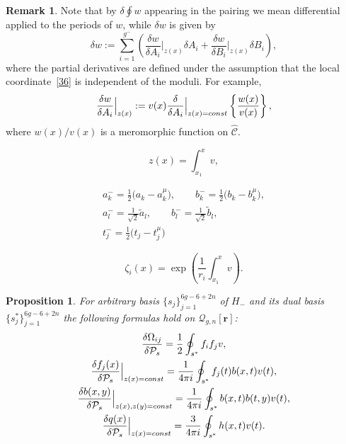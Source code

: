 \documentclass[10pt,a4paper]{article}
\numberwithin{equation}{section}
\newtheorem{Proposition}[Theorem]{Proposition}
\theoremstyle{definition}
\newtheorem{Remark}[Theorem]{Remark}
\begin{document}
\begin{Remark}
Note that by $\delta \oint w$ appearing in the pairing we mean differential applied to the periods of $w$, while $\delta w$ is given by
\begin{equation}\label{80}\delta w:=\sum^{g^-}_{i=1} \left(\frac{\delta w}{\delta A_i}\Big|_{z(x)} \delta A_i +\frac{\delta w}{\delta B_i}\Big|_{z(x)} \delta B_i\right),\end{equation}
where the partial derivatives are defined under the assumption that the local coordinate~\eqref{36} is independent of the moduli. For example,
\begin{equation*}\frac{\delta w}{\delta A_i}\Big|_{z(x)}:=
v(x) \frac{\delta}{\delta A_i}\Big|_{z(x)={\rm const}}\left\{\frac{w(x)}{v(x)}\right\}, \end{equation*}
where $w(x)/v(x)$ is
a meromorphic function on $\hat{\mathcal{C}}$.
\end{Remark}

\begin{equation}\label{36}
z(x)=\int^x_{x_1}v,
\end{equation}

\begin{gather}\label{32}a^-_k=\frac{1}{2}\big(a_k-a^\mu_k\big), \qquad b^-_k=\frac{1}{2}\big(b_k-b^\mu_k\big),\\
\label{33}a^-_l=\frac{1}{\sqrt{2}}\tilde{a}_l, \qquad b^-_l=\frac{1}{\sqrt{2}}\tilde{b}_l,\\
t^-_j=\frac{1}{2}\big(t_j-t^\mu_j\big)\nonumber
\end{gather}

\begin{equation}\label{39}\zeta_i(x)=\exp \left(\frac{1}{ r_i} \int^x_{x_1}v\right). \end{equation}

\begin{Proposition}
For arbitrary basis $\{s_j\}^{6g-6+2n}_{j=1}$ of $H_-$ and its dual basis $\{ s^{*}_{j} \}^{6g-6+2n}_{j=1}$ the following formulas hold on $\mathcal{Q}_{g,n}[\mathbf{r}]$:
\begin{gather}\label{51}\frac{\delta \Omega_{ij}}{\delta \mathcal{P}_{s}}=\frac{1}{2}\oint_{s^*}{f}_i {f}_j v,\\
\label{52}\frac{\delta f_j(x)} {\delta \mathcal{P}_s}\Big|_{z(x)={\rm const}}=\frac{1}{4 \pi {\rm i}}\oint_{s^*}{f}_j(t){b}(x,t)v(t),\\
\label{53}\frac{\delta b(x,y)}{\delta \mathcal{P}_s}\Big|_{z(x),z(y)={\rm const}}=\frac{1}{4 \pi {\rm i}}\oint_{s^*}{b}(x,t){b}(t,y)v(t),\\
\label{54}\frac{\delta q(x)}{\delta \mathcal{P}_s}\Big|_{z(x)={\rm const}}=\frac{3}{4 \pi {\rm i}}\oint_{s^*}{h}(x,t)v(t).\end{gather}
\end{Proposition}
\end{document}
